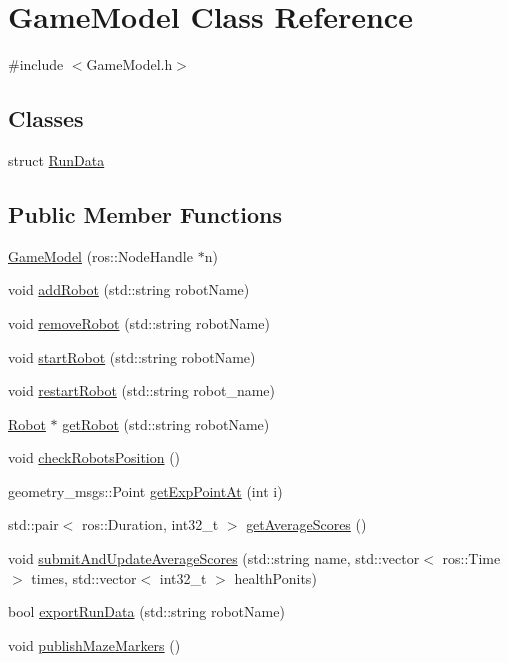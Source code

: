 \hypertarget{classGameModel}{\section{Game\-Model Class Reference}
\label{classGameModel}
}


{\ttfamily \#include $<$Game\-Model.\-h$>$}

\subsection*{Classes}
\begin{DoxyCompactItemize}
\item 
struct \hyperlink{structGameModel_1_1RunData}{Run\-Data}
\end{DoxyCompactItemize}
\subsection*{Public Member Functions}
\begin{DoxyCompactItemize}
\item 
\hyperlink{classGameModel_a92c0fc830dfc328b743b26b4cf72d016}{Game\-Model} (ros\-::\-Node\-Handle $\ast$n)
\item 
void \hyperlink{classGameModel_ac39420ce3fecb4b797ef6bf3867ef71b}{add\-Robot} (std\-::string robot\-Name)
\item 
void \hyperlink{classGameModel_a7317d434b62b0cbb2434759073799f00}{remove\-Robot} (std\-::string robot\-Name)
\item 
void \hyperlink{classGameModel_aa1adb23fb2d362aaf78c246190929b55}{start\-Robot} (std\-::string robot\-Name)
\item 
void \hyperlink{classGameModel_a81341f79e9de8c1aa4652646b24a3c89}{restart\-Robot} (std\-::string robot\-\_\-name)
\item 
\hyperlink{classRobot}{Robot} $\ast$ \hyperlink{classGameModel_a70a99a2c666476196557965db8e08a4f}{get\-Robot} (std\-::string robot\-Name)
\item 
void \hyperlink{classGameModel_a13965aade5f25efd05b80dc243c743e2}{check\-Robots\-Position} ()
\item 
geometry\-\_\-msgs\-::\-Point \hyperlink{classGameModel_a92c45ad458ad6ac291d63f7a78df7234}{get\-Exp\-Point\-At} (int i)
\item 
std\-::pair$<$ ros\-::\-Duration, int32\-\_\-t $>$ \hyperlink{classGameModel_a67bc2f3c8c34186b8b619bb6cb57f52d}{get\-Average\-Scores} ()
\item 
void \hyperlink{classGameModel_ac3f3c95b80faaafc9a1145dd7ab336de}{submit\-And\-Update\-Average\-Scores} (std\-::string name, std\-::vector$<$ ros\-::\-Time $>$ times, std\-::vector$<$ int32\-\_\-t $>$ health\-Ponits)
\item 
bool \hyperlink{classGameModel_a11f9a0ca936f6e4d146d1129738d9c69}{export\-Run\-Data} (std\-::string robot\-Name)
\item 
void \hyperlink{classGameModel_a55128eaad5aa63c89bc3b0907412f2a5}{publish\-Maze\-Markers} ()
\end{DoxyCompactItemize}
